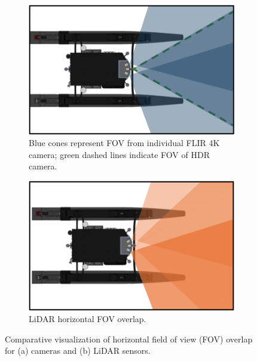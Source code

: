 \documentclass{erauthesis}
\begin{document}
\begin{figure}[htbp]
\centering
\begin{subfigure}[t]{0.48\textwidth}
    \centering
    \includegraphics[width=\textwidth]{Images/fov_cam.png}
    \caption{Blue cones represent FOV from individual FLIR 4K camera; green dashed lines indicate FOV of HDR camera.}
    \label{fig:fov_cam}
\end{subfigure}
\hfill
\begin{subfigure}[t]{0.48\textwidth}
    \centering
    \includegraphics[width=\textwidth]{Images/fov_lidar.png}
    \caption{LiDAR horizontal FOV overlap.}
    \label{fig:fov_lidar}
\end{subfigure}
\caption{Comparative visualization of horizontal field of view (FOV) overlap for (a) cameras and (b) LiDAR sensors.}
\label{fig:fov_combined}
\end{figure}

\end{document}
